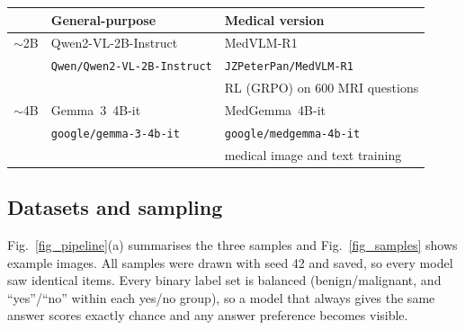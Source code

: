 \documentclass[doublecolumn]{ijcvsplatex}
\newcommand{\qwen}{Qwen2-VL}
\newcommand{\medvlm}{MedVLM-R1}
\newcommand{\gemma}{Gemma~3}
\newcommand{\medgemma}{MedGemma}
\begin{document}
\par\medskip\noindent
\begin{minipage}{\columnwidth}
\centering
{}
\label{tab_models}
\footnotesize
\setlength{\tabcolsep}{3pt}
\begin{tabular}{@{}lll@{}}
\toprule
 & \textbf{General-purpose} & \textbf{Medical version} \\
\midrule
$\sim$2B & \qwen{}-2B-Instruct~\cite{wang2024qwen2vl} & \medvlm{}~\cite{pan2025medvlmr1} \\
 & \scriptsize\texttt{Qwen/Qwen2-VL-2B-Instruct} & \scriptsize\texttt{JZPeterPan/MedVLM-R1} \\
 & & \scriptsize RL (GRPO) on 600 MRI questions \\
\midrule
$\sim$4B & \gemma{}~4B-it~\cite{gemma3} & \medgemma{}~4B-it~\cite{sellergren2025medgemma} \\
 & \scriptsize\texttt{google/gemma-3-4b-it} & \scriptsize\texttt{google/medgemma-4b-it} \\
 & & \scriptsize medical image and text training \\
\bottomrule
\end{tabular}
\end{minipage}
\par\medskip

\subsection{Datasets and sampling}
\label{sec_data}
Fig.~\ref{fig_pipeline}(a) summarises the three samples and Fig.~\ref{fig_samples} shows example images. All samples were drawn with seed 42 and saved, so every model saw identical items. Every binary label set is balanced (benign/malignant, and ``yes''/``no'' within each yes/no group), so a model that always gives the same answer scores exactly chance and any answer preference becomes visible.
\end{document}
